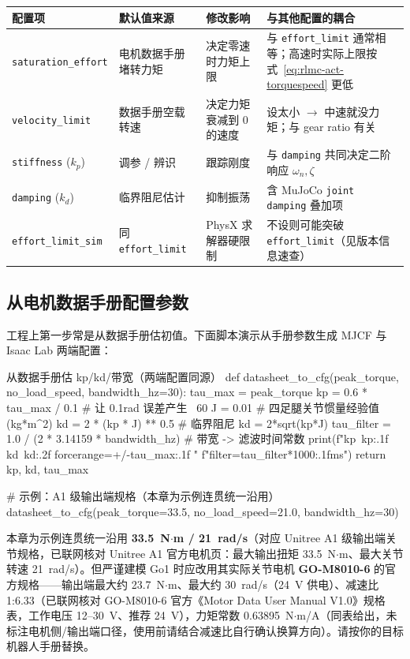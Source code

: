 \begin{center}
\small
\begin{tabular}{@{}lp{2.6cm}p{3.2cm}p{3.4cm}@{}}
\toprule
配置项 & 默认值来源 & 修改影响 & 与其他配置的耦合 \\
\midrule
\verb|saturation_effort| & 电机数据手册堵转力矩 & 决定零速时力矩上限 & 与 \verb|effort_limit| 通常相等；高速时实际上限按式~\eqref{eq:rlmc-act-torquespeed} 更低 \\
\verb|velocity_limit| & 数据手册空载转速 & 决定力矩衰减到 0 的速度 & 设太小 $\to$ 中速就没力矩；与 gear ratio 有关 \\
\verb|stiffness| ($k_p$) & 调参 / 辨识 & 跟踪刚度 & 与 \verb|damping| 共同决定二阶响应 $\omega_n,\zeta$ \\
\verb|damping| ($k_d$) & 临界阻尼估计 & 抑制振荡 & 含 MuJoCo \verb|joint damping| 叠加项 \\
\verb|effort_limit_sim| & 同 \verb|effort_limit| & PhysX 求解器硬限制 & 不设则可能突破 \verb|effort_limit|（见版本信息速查） \\
\bottomrule
\end{tabular}
\end{center}

\subsection{从电机数据手册配置参数}
\label{sec:rlmc-act-datasheet}

工程上第一步常是从数据手册估初值。下面脚本演示从手册参数生成 MJCF 与 Isaac Lab 两端配置：

\begin{codebox}[Python]{从数据手册估 kp/kd/带宽（两端配置同源）}
def datasheet_to_cfg(peak_torque, no_load_speed, bandwidth_hz=30):
    tau_max = peak_torque
    kp = 0.6 * tau_max / 0.1            # 让 0.1rad 误差产生 ~60%
    J = 0.01                            # 四足腿关节惯量经验值 (kg*m^2)
    kd = 2 * (kp * J) ** 0.5            # 临界阻尼 kd = 2*sqrt(kp*J)
    tau_filter = 1.0 / (2 * 3.14159 * bandwidth_hz)  # 带宽 -> 滤波时间常数
    print(f"kp~{kp:.1f}  kd~{kd:.2f}  forcerange=+/-{tau_max:.1f}  "
          f"filter={tau_filter*1000:.1f}ms")
    return kp, kd, tau_max

# 示例：A1 级输出端规格（本章为示例连贯统一沿用）
datasheet_to_cfg(peak_torque=33.5, no_load_speed=21.0, bandwidth_hz=30)
\end{codebox}

\begin{note}
本章为示例连贯统一沿用 \textbf{33.5~N$\cdot$m / 21~rad/s}（对应 Unitree A1 级输出端关节规格，已联网核对 Unitree A1 官方电机页：最大输出扭矩 33.5~N$\cdot$m、最大关节转速 21~rad/s）。但严谨建模 Go1 时应改用其实际关节电机 \textbf{GO-M8010-6} 的官方规格——输出端最大约 23.7~N$\cdot$m、最大约 30~rad/s（24~V 供电）、减速比 1:6.33（已联网核对 GO-M8010-6 官方《Motor Data User Manual V1.0》规格表，工作电压 12--30~V、推荐 24~V），力矩常数 0.63895~N$\cdot$m/A（同表给出，未标注电机侧/输出端口径，使用前请结合减速比自行确认换算方向）。请按你的目标机器人手册替换。
\end{note}


